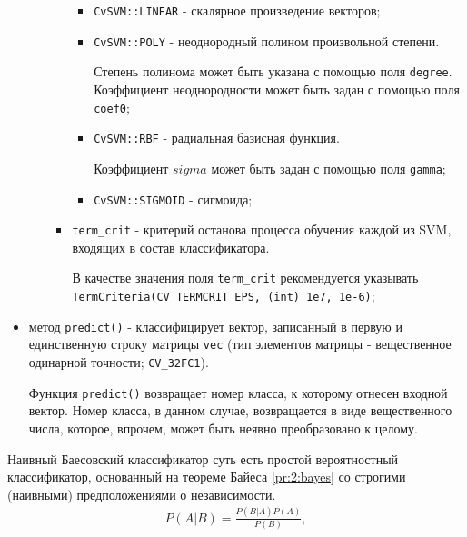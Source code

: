 \begin{itemize}
\begin{itemize}
\begin{itemize}
			\begin{itemize}
				
				\item \verb|CvSVM::LINEAR| - скалярное произведение векторов;
				\item \verb|CvSVM::POLY| - неоднородный полином произвольной степени.

				Степень полинома может быть указана с помощью поля \verb|degree|. Коэффициент неоднородности может быть задан с помощью поля \verb|coef0|;

				\item \verb|CvSVM::RBF| - радиальная базисная функция.

				Коэффициент $sigma$ может быть задан с помощью поля \verb|gamma|;

				\item \verb|CvSVM::SIGMOID| - сигмоида;

			\end{itemize}

			\item \verb|term_crit| - критерий останова процесса обучения каждой из SVM, входящих в состав классификатора.
			
			В качестве значения поля \verb|term_crit| рекомендуется указывать \linebreak \verb|TermCriteria(CV_TERMCRIT_EPS, (int) 1e7, 1e-6)|;

		\end{itemize}

	\end{itemize}

	\item метод \verb|predict()| - классифицирует вектор, записанный в первую и единственную строку матрицы \verb|vec| (тип элементов матрицы - вещественное одинарной точности; \verb|CV_32FC1|).

	Функция \verb|predict()| возвращает номер класса, к которому отнесен входной вектор. Номер класса, в данном случае, возвращается в виде вещественного числа, которое, впрочем, может быть неявно преобразовано к целому.

\end{itemize}


Наивный Баесовский классификатор суть есть простой вероятностный классификатор, основанный на теореме Байеса \eqref{pr:2:bayes} со строгими (наивными) предположениями о независимости.
\begin{gather}
	\label{pr:2:bayes}
	P(A | B) = \frac{P(B | A) P(A)}{P(B)},
\end{gather}

